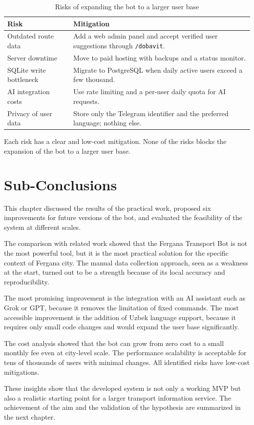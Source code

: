 \begin{table}[h]
\centering
\caption{Risks of expanding the bot to a larger user base}
\label{tab:risks}
\begin{tabular}{p{}p{}}
\hline
\textbf{Risk} & \textbf{Mitigation} \\
\hline
Outdated route data & Add a web admin panel and accept verified user
suggestions through \texttt{/dobavit}. \\
Server downtime & Move to paid hosting with backups and a status
monitor. \\
SQLite write bottleneck & Migrate to PostgreSQL when daily active
users exceed a few thousand. \\
AI integration costs & Use rate limiting and a per-user daily quota for
AI requests. \\
Privacy of user data & Store only the Telegram identifier and the
preferred language; nothing else. \\
\hline
\end{tabular}
\end{table}

Each risk has a clear and low-cost mitigation. None of the risks blocks
the expansion of the bot to a larger user base.

\section{Sub-Conclusions}
\label{sec:ch4-subconclusions}

This chapter discussed the results of the practical work, proposed six
improvements for future versions of the bot, and evaluated the
feasibility of the system at different scales.

The comparison with related work showed that the Fergana Transport Bot is
not the most powerful tool, but it is the most practical solution for the
specific context of Fergana city. The manual data collection approach,
seen as a weakness at the start, turned out to be a strength because of
its local accuracy and reproducibility.

The most promising improvement is the integration with an AI assistant
such as Grok or GPT, because it removes the limitation of fixed commands.
The most accessible improvement is the addition of Uzbek language
support, because it requires only small code changes and would expand the
user base significantly.\cite{dale2016return}

The cost analysis showed that the bot can grow from zero cost to a small
monthly fee even at city-level scale. The performance scalability is
acceptable for tens of thousands of users with minimal changes. All
identified risks have low-cost mitigations.

These insights show that the developed system is not only a working MVP
but also a realistic starting point for a larger transport information
service. The achievement of the aim and the validation of the hypothesis
are summarized in the next chapter.